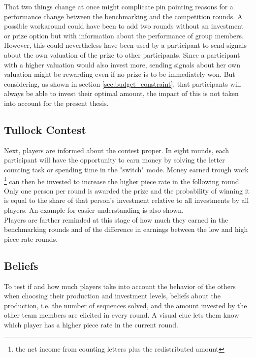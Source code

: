     That two things change at once might complicate pin pointing reasons for a performance change between the benchmarking and the competition rounds. A possible workaround could have been to add two rounds without an investment or prize option but with information about the performance of group members. However, this could nevertheless have been used by a participant to send signals about the own valuation of the prize to other participants. Since a participant with a higher valuation would also invest more, sending signals about her own valuation might be rewarding even if no prize is to be immediately won. But considering, as shown in section \ref{sec:budget_constraint}, that participants will always be able to invest their optimal amount, the impact of this is not taken into account for the present thesis.\\
    
    \subsection{Tullock Contest}
    
    Next, players are informed  about the contest proper. In eight rounds, each participant will have the opportunity to earn money by solving the letter counting task or spending time in the "switch" mode. Money earned trough work \footnote{the net income from counting letters plus the redistributed amount} can then be invested to increase the higher piece rate in the following round. Only one person per round is awarded the prize and the probability of winning it is equal to the share of that person's investment relative to all investments by all players. An example for easier understanding is also shown.\\
    
    Players are farther reminded at this stage of how much they earned in the benchmarking rounds and of the difference in earnings between the low and high piece rate rounds.\\
    
    \subsection{Beliefs}
    
    To test if and how much players take into account the behavior of the others when choosing their production and investment levels, beliefs about the production, i.e. the number of sequences solved, and the amount invested by the other team members are elicited in every round. A visual clue lets them know which player has a higher piece rate in the current round.
    
